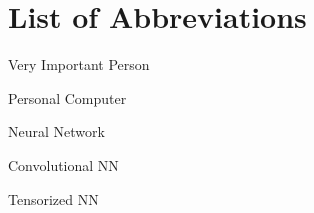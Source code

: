\section{List of Abbreviations}

\begin{description}[leftmargin=!,labelwidth=2cm]
    \item [VIP] Very Important Person
    \item [PC] Personal Computer
    \item [NN] Neural Network
    \item [CNN] Convolutional NN
    \item [TNN] Tensorized NN

\end{description}
